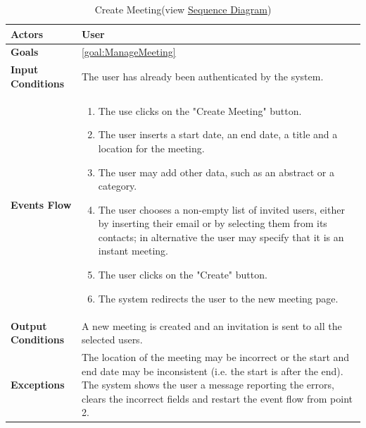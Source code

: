 \begin{table}[H]
	\centering
	\def\arraystretch{1.5}
	\begin{tabular}{|m{7cm}|m{7cm}|}
		\hline
		\textbf{Actors}            & User		    \\ \hline
		\textbf{Goals}             & \ref{goal:ManageMeeting}           \\ \hline
		\textbf{Input Conditions}  & The user has already been authenticated by the system.           \\ \hline
		\textbf{Events Flow}       & 
			\begin{enumerate}[topsep=0pt, leftmargin=*]
				\item The use clicks on the "Create Meeting" button.
				\item The user inserts a start date, an end date, a title and a location for the meeting.
				\item The user may add other data, such as an abstract or a category.
				\item The user chooses a non-empty list of invited users, either by inserting their email or by selecting them from its contacts; in alternative the user may specify that it is an instant meeting.
				\item The user clicks on the "Create" button.
				\item The system redirects the user to the new meeting page.
			\end{enumerate}               \\ \hline
		\textbf{Output Conditions} & A new meeting is created and an invitation is sent to all the selected users.           \\ \hline
		\textbf{Exceptions}        & The location of the meeting may be incorrect or the start and end date may be inconsistent (i.e. the start is after the end). The system shows the user a message reporting the errors, clears the incorrect fields and restart the event flow from point 2.          \\ \hline
	\end{tabular}
	\caption[Create Meeting]{{Create Meeting}\label{UseCaseDescr:CreateMeeting} (view \hyperref[SeqDiagr:CreateMeeting]{Sequence Diagram})}
\end{table}

